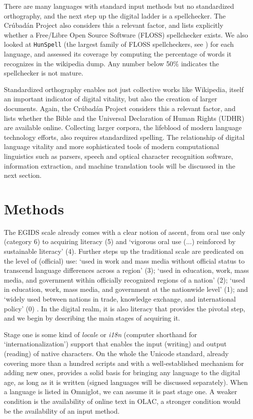 \documentclass[10pt]{article}
\begin{document}
There are many languages with standard input methods but no standardized
orthography, and the next step up the digital ladder is a spellchecker. The
Cr\'ubad\'an Project also considers this a relevant factor, and lists
explicitly whether a Free/Libre Open Source Software (FLOSS) spellchecker
exists. We also looked at {\tt HunSpell} (the largest family of FLOSS
spellcheckers, see \cite{Nemeth:2004}) for each language, and assessed its
coverage by computing the percentage of words it recognizes in the wikipedia
dump. Any number below 50\% indicates the spellchecker is not mature.

Standardized orthography enables not just collective works like Wikipedia,
itself an important indicator of digital vitality, but also the creation of
larger documents. Again, the Cr\'ubad\'an Project considers this a relevant
factor, and lists whether the Bible and the Universal Declaration of Human
Rights (UDHR) are available online. Collecting larger corpora, the lifeblood
of modern language technology efforts, also requires standardized spelling.
The relationship of digital language vitality and more sophisticated tools of
modern computational linguistics such as parsers, speech and optical character
recognition software, information extraction, and machine translation tools
will be discussed in the next section. 

\section*{Methods}

{\color{black} The EGIDS scale already comes with a clear notion of ascent,
  from oral use only (category 6) to acquiring literacy (5) and `vigorous oral
  use (...) reinforced by sustainable literacy' (4). Further steps up the
  traditional scale are predicated on the level of (official) use: `used in work
  and mass media without official status to transcend language differences
  across a region' (3); `used in education, work, mass media, and government
  within officially recognized regions of a nation' (2); `used in education,
  work, mass media, and government at the nationwide level' (1); and
  `widely used between nations in trade, knowledge exchange, and international
  policy' (0) \cite{Quakenbush:2012}. In the digital realm, it is also
  literacy that provides the pivotal step, and we begin by describing the main
  stages of acquiring it.}

Stage one is some kind of {\it locale} or {\it i18n} (computer shorthand for
`internationalization') support that enables the input (writing) and output
(reading) of native characters. On the whole the Unicode standard, already
covering more than a hundred scripts and with a well-established mechanism for
adding new ones, provides a solid basis for bringing any language to the
digital age, as long as it is written (signed languages will be discussed
separately). When a language is listed in Omniglot, we can assume it is past
stage one. A weaker condition is the availability of online text in OLAC, a
stronger condition would be the availability of an input method.
\end{document}
